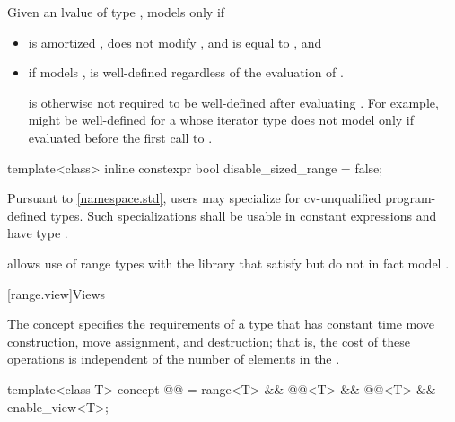 \begin{itemdescr}
\pnum
Given an lvalue  of type , 
models  only if
\begin{itemize}
\item {} is amortized , does not modify ,
and is equal to , and

\item if  models ,
 is well-defined regardless of the evaluation of
.
\begin{note}
 is otherwise not required to be
well-defined after evaluating .
For example,  might be well-defined
for a  whose iterator type
does not model 
only if evaluated before the first call to .
\end{note}
\end{itemize}
\end{itemdescr}

%
\begin{itemdecl}
template<class>
  inline constexpr bool disable_sized_range = false;
\end{itemdecl}

\begin{itemdescr}
\pnum
\remarks
Pursuant to \ref{namespace.std},
users may specialize 
for cv-unqualified program-defined types.
Such specializations shall
be usable in constant expressions and
have type .

\pnum
\begin{note}
 allows use of range types with the library
that satisfy but do not in fact model .
\end{note}
\end{itemdescr}

[range.view]{Views}

\pnum
The  concept specifies the requirements of a  type
that has constant time move construction, move assignment, and destruction;
that is, the cost of these operations is
independent of the number of elements in the .

\begin{itemdecl}
template<class T>
  concept @@ =
    range<T> && @@<T> && @@<T> && enable_view<T>;
\end{itemdecl}

